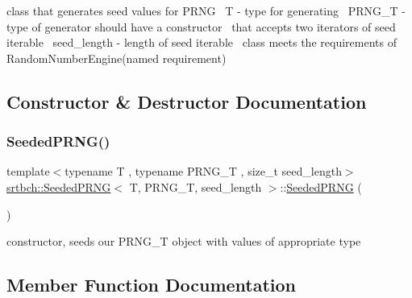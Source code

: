 class that generates seed values for P\+R\+NG~\newline
T -\/ type for generating~\newline
P\+R\+N\+G\+\_\+T -\/ type of generator should have a constructor~\newline
that accepts two iterators of seed iterable~\newline
seed\+\_\+length -\/ length of seed iterable~\newline
class meets the requirements of Random\+Number\+Engine(named requirement) 

\subsection{Constructor \& Destructor Documentation}
\mbox{\label{classsrtbch_1_1SeededPRNG_ade7faf721a3b9d817886f3ed7eb263af}} 
\subsubsection{\texorpdfstring{Seeded\+P\+R\+N\+G()}{SeededPRNG()}}
{\footnotesize\ttfamily template$<$typename T , typename P\+R\+N\+G\+\_\+T , size\+\_\+t seed\+\_\+length$>$ \\
\hyperlink{classsrtbch_1_1SeededPRNG}{srtbch\+::\+Seeded\+P\+R\+NG}$<$ T, P\+R\+N\+G\+\_\+T, seed\+\_\+length $>$\+::\hyperlink{classsrtbch_1_1SeededPRNG}{Seeded\+P\+R\+NG} (\begin{DoxyParamCaption}{ }\end{DoxyParamCaption})\hspace{0.3cm}{\ttfamily [inline]}}

constructor, seeds our P\+R\+N\+G\+\_\+T object with values of appropriate type 

\subsection{Member Function Documentation}
\mbox{\label{classsrtbch_1_1SeededPRNG_aea9b901a9dc7ad6a7fe328ff291c72c1}} 
